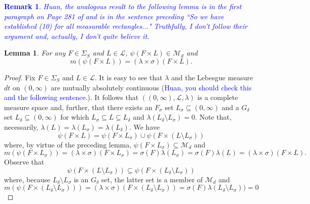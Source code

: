 \documentclass[11pt]{article}
\theoremstyle{theorem}
\newtheorem{lemma}[theorem]{Lemma}
\newtheorem{remark}{Remark}
\begin{document}
\textcolor{blue}{\begin{remark}
Huan, the analogous result to the following lemma is in the first paragraph on Page 281 of \cite{Stein2005} and is in the sentence preceding ``So we have established (10) for all measurable rectangles..." Truthfully, I don't follow their argument and, actually, I don't quite believe it. 
\end{remark}}
\begin{lemma}\label{lem:AllMeasurableRectangles} For any $F\in \Sigma_S$ and $L\in\mathcal{L}$, $\psi(F\times L)\in\mathcal{M}_d$ and 
\begin{equation*}
m(\psi(F\times L))=(\lambda\times\sigma)(F\times L).
\end{equation*}
\end{lemma}
\begin{proof}
Fix $F\in\Sigma_S$ and $L\in\mathcal{L}$. It is easy to see that $\lambda$ and the Lebesgue measure $dt$ on $(0,\infty)$ are mutually absolutely continuous (\textcolor{blue}{Huan, you should check this and the following sentence.}). It follows that $((0,\infty), \mathcal{L},\lambda)$ is a complete measure space and, further, that there exists an $F_\sigma$ set $L_\sigma\subseteq (0,\infty)$ and a $G_\delta$ set $L_\delta\subseteq (0,\infty)$ for which $L_\sigma\subseteq L\subseteq L_\delta$ and $\lambda(L_\delta\setminus L_\sigma)=0$. Note that, necessarily, $\lambda(L)=\lambda(L_\sigma)=\lambda(L_\delta)$. We have
\begin{equation}\label{eq:AllMeasurableRectangles1}
\psi(F\times L)=\psi(F\times L_\sigma)\cup\psi(F\times (L\setminus L_\sigma))
\end{equation}
where, by virtue of the preceding lemma, $\psi(F\times L_\sigma)\subseteq \mathcal{M}_d$ and
\begin{equation}\label{eq:AllMeasurableRectangles2}
m(\psi(F\times L_{\sigma}))=(\lambda\times\sigma)(F\times L_\sigma)=\sigma(F)\lambda(L_\sigma)=\sigma(F)\lambda(L)=(\lambda\times\sigma)(F\times L).
\end{equation}
Observe that
\begin{equation*}
\psi(F\times (L\setminus L_\sigma))\subseteq \psi(F\times (L_{\delta}\setminus L_\sigma))
\end{equation*}
where, because $L_\delta\setminus L_\sigma$ is an $G_{\delta}$ set, the latter set is a member of $\mathcal{M}_d$ and
\begin{equation*}
m(\psi(F\times (L_\delta\setminus L_\sigma)))=(\lambda\times\sigma)(F\times (L_\delta\setminus L_\sigma))=\sigma(F)\lambda(L_\delta\setminus L_\sigma))=0

\end{equation*}
\end{proof}
\end{document}

